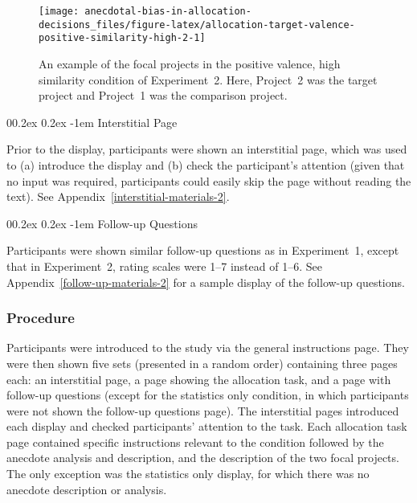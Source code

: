 \documentclass[
  man, donotrepeattitle,floatsintext]{apa7}
\makeatletter
\let\oldparagraph\paragraph
\renewcommand{\paragraph}[1]{\oldparagraph{#1}\mbox{}}
\renewcommand{\paragraph}{\@startsection{paragraph}{4}{\parindent}%
  {0\baselineskip \@plus 0.2ex \@minus 0.2ex}%
  {-1em}%
  {\normalfont\normalsize\bfseries\itshape\typesectitle}}
\theoremstyle{definition}
\theoremstyle{definition}
\theoremstyle{definition}
\theoremstyle{definition}
\theoremstyle{remark}
\makeatother
\begin{document}
\begin{figure}
\texttt{[image: anecdotal-bias-in-allocation-decisions\_files/figure-latex/allocation-target-valence-positive-similarity-high-2-1]} \caption{An example of the focal projects in the positive valence, high similarity condition of Experiment~2. Here, Project~2 was the target project and Project~1 was the comparison project.}\label{fig:allocation-target-valence-positive-similarity-high-2}
\end{figure}

\hypertarget{interstitial-page}{%
\paragraph{Interstitial Page}\label{interstitial-page}}

Prior to the display, participants were shown an interstitial page, which was
used to (a) introduce the display and (b) check the participant's attention
(given that no input was required, participants could easily skip the page
without reading the text). See
Appendix~\ref{interstitial-materials-2}.

\hypertarget{follow-up-questions-1}{%
\paragraph{Follow-up Questions}\label{follow-up-questions-1}}

Participants were shown similar follow-up questions as in Experiment~1, except
that in Experiment~2, rating scales were 1--7 instead of 1--6. See
Appendix~\ref{follow-up-materials-2} for a sample display of the
follow-up questions.

\hypertarget{procedure-1}{%
\subsubsection{Procedure}\label{procedure-1}}

Participants were introduced to the study via the general instructions page.
They were then shown five sets (presented in a random order) containing three
pages each: an interstitial page, a page showing the allocation task, and a page
with follow-up questions (except for the statistics only condition, in which
participants were not shown the follow-up questions page). The interstitial
pages introduced each display and checked participants' attention to the task.
Each allocation task page contained specific instructions relevant to the
condition followed by the anecdote analysis and description, and the description
of the two focal projects. The only exception was the statistics only display,
for which there was no anecdote description or analysis.
\end{document}
